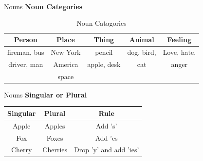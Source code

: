 \documentclass{beamer}
\begin{document}
\begin{frame}{Nouns}
\centering
  \textbf{ Noun Categories} \\
  \begin{table}[]
      \centering
      \begin{tabular}{|c|c|c|c|c|}
      \hline
\textbf{ Person }& \textbf{Place} & \textbf{Thing} & \textbf{Animal} & \textbf{Feeling}  \\
\hline fireman, bus & New York & pencil & dog, bird, & Love, hate,\\
driver, man & America & apple, desk & cat & anger\\
 & space & & &\\
 \hline
      \end{tabular}
      \caption{Noun Catagories}
      \label{tab:placeholder}
  \end{table}
\end{frame}

\begin{frame}{Nouns}
\centering
\textbf{Singular or Plural}\\
\begin{table}[h]
\centering
\begin{tabular}{|c|c|c|}
\hline
\textbf{Singular} & \textbf{Plural} & \textbf{Rule}\\
\hline
Apple & Apples & Add 's'\\
\hline
Fox & Foxes & Add 'es\\
\hline
Cherry & Cherries & Drop 'y' and add 'ies'\\
\hline
\end{tabular}
    
\end{table}

\end{frame}
\end{document}
